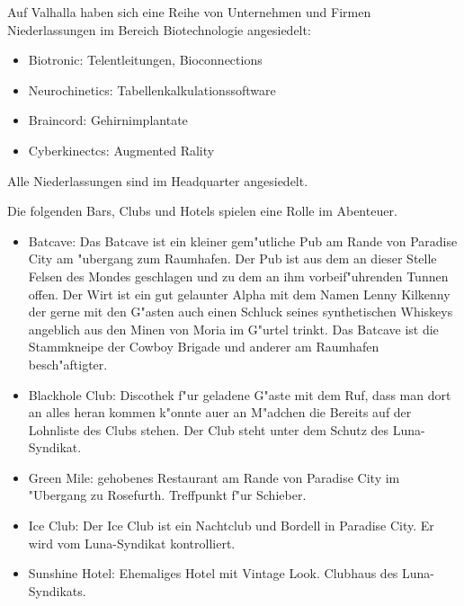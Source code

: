 
Auf Valhalla haben sich eine Reihe von Unternehmen und Firmen Niederlassungen im Bereich Biotechnologie angesiedelt:

\begin{itemize}
    \item Biotronic: Telentleitungen, Bioconnections
    \item Neurochinetics: Tabellenkalkulationssoftware
    \item Braincord: Gehirnimplantate
    \item Cyberkinectcs: Augmented Rality
\end{itemize}

Alle Niederlassungen sind im Headquarter angesiedelt.


Die folgenden Bars, Clubs und Hotels spielen eine Rolle im Abenteuer.

\begin{itemize}
    \item Batcave: Das Batcave ist ein kleiner gem"utliche Pub am Rande von Paradise City am "ubergang zum Raumhafen. Der Pub ist aus dem an dieser Stelle Felsen des Mondes geschlagen und zu dem an ihm vorbeif"uhrenden Tunnen offen. Der Wirt ist ein gut gelaunter Alpha mit dem Namen Lenny Kilkenny der gerne mit den G"asten auch einen Schluck seines synthetischen Whiskeys angeblich aus den Minen von Moria im G"urtel trinkt. Das Batcave ist die Stammkneipe der Cowboy Brigade und anderer am Raumhafen besch"aftigter.
    \item Blackhole Club: Discothek f"ur geladene G"aste mit dem Ruf, dass man dort an alles heran kommen k"onnte au\3er an M"adchen die Bereits auf der Lohnliste des Clubs stehen. Der Club steht unter dem Schutz des Luna-Syndikat.
    \item Green Mile: gehobenes Restaurant am Rande von Paradise City im "Ubergang zu Rosefurth.  Treffpunkt f"ur Schieber.
    \item Ice Club: Der Ice Club ist ein Nachtclub und Bordell in Paradise City. Er wird vom Luna-Syndikat kontrolliert.
    \item Sunshine Hotel: Ehemaliges Hotel mit Vintage Look. Clubhaus des Luna-Syndikats.
    
\end{itemize}

